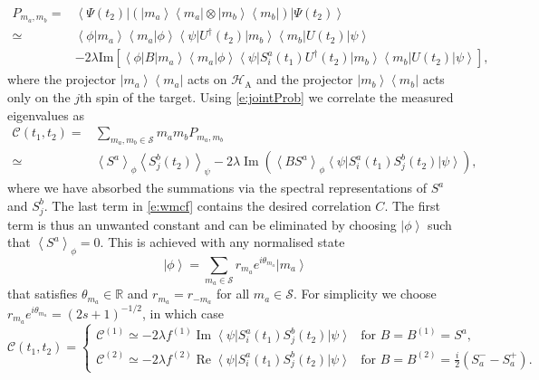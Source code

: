 \documentclass[epjST,numbook]{svjour}
\newcommand\RR{{\mathds{R}}}
\newcommand{\wmcf}{\mathscr{C}}
\newcommand{\ket}[1]{\left \vert #1 \right >}
\newcommand{\bra}[1]{\left < #1 \right \vert}
\newcommand{\matel}[3]{ \displaystyle \left\langle #1 \right \vert #2 \left\vert  #3 \right\rangle }
\newcommand{\expval}[1]{\left\langle #1 \right\rangle}
\newcommand{\innprod}[2]{ \displaystyle \left\langle #1 \vert #2 \right\rangle }
\newcommand{\impart}[1]{\text{Im}\left[ #1 \right]}
\DeclareMathOperator{\imp }{\mathrm{Im}}
\DeclareMathOperator{\rep}{\mathrm{Re}}
\begin{document}
\begin{equation}\label{e:jointProb}
	\begin{split}
		P_{m_a,m_b} =& \matel{\Psi(t_2)}{\left( \ket{m_a}\!\bra{m_a} \otimes \ket{m_b}\!\bra{m_b} \right)}{\Psi(t_2)} \\
		\simeq& \innprod{\phi}{m_a}\!\innprod{m_a}{\phi}\matel{\psi}{U^\dagger(t_2)\ket{m_b}\!\bra{m_b}U(t_2)}{\psi} \\
		&-2\lambda \impart{\matel{\phi}{B}{m_a}\!\innprod{m_a}{\phi}\matel{\psi}{ S^a_i (t_1) U^\dagger(t_2) \ket{m_b}\!\bra{m_b} U(t_2)}{\psi} },
	\end{split}
\end{equation}
where the projector $\ket{m_a}\bra{m_a}$ acts on $\mathscr{H}_\text{A}$ and the  projector $\ket{m_b}\bra{m_b}$ acts only on the $j$th spin of the target.
Using \eqref{e:jointProb} we correlate the measured eigenvalues as
\begin{equation}\label{e:wmcf}
	\begin{split}
	\wmcf(t_1,t_2) =& \sum_{ m_a, m_b \in \mathscr{S} } m_a m_b P_{m_a , m_b} \\
	\simeq& \expval{S^a}_{\phi} \expval{S_j^b(t_2)}_{\psi} - 2 \lambda \imp \left( \expval{B S^a}_{\phi} \matel{\psi}{  S^a_i(t_1) S_j^b(t_2) }{\psi} \right),
	\end{split}	
\end{equation}
where we have absorbed the summations via the spectral representations of $S^a$ and $S_j^b$.
The last term in \eqref{e:wmcf} contains the desired correlation $C$. The first term is thus an unwanted constant and can be eliminated by choosing $\ket{\phi}$ such that $\expval{S^a}_\phi=0$. This is achieved with any normalised state 
\begin{equation}\label{e:phi}
	\ket{\phi}=\sum_{m_a\in \mathscr{S}}r_{m_a} e^{i\theta_{m_a}} \ket{m_a} 
\end{equation}
that satisfies $\theta_{m_a} \in \RR$ and $r_{m_a}=r_{-m_a}$ for all $m_a \in \mathscr{S}$. For simplicity we choose $r_{m_a} e^{i\theta_{m_a}}=(2s+1)^{-1/2}$, in which case
\begin{equation}\label{e:wmcfFinal}
	\wmcf(t_1,t_2) = 
	\begin{cases}
		\wmcf^{(1)} \simeq -2\lambda f^{(1)} \imp{\matel{\psi}{ S^a_i(t_1) S_j^b(t_2) }{\psi}} & \text{for $B=B^{(1)}=S^a$}, \\
		\wmcf^{(2)} \simeq -2\lambda f^{(2)} \rep{\matel{\psi}{ S^a_i(t_1) S_j^b(t_2) }{\psi}} & \text{for $B=B^{(2)}=\frac{i}{2}\left(S_a^--S_a^+\right)$}.
	\end{cases}
\end{equation}
\end{document}
